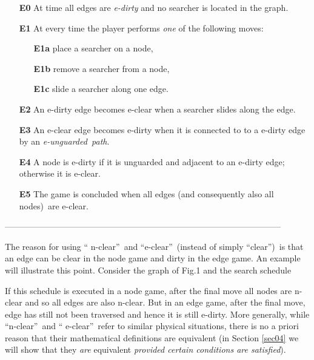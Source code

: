 \documentclass[11pt]{article}\usepackage{amsmath}
\begin{document}
\begin{enumerate}
\item[\textbf{{E0}}] At time  all edges are \emph{e-dirty} and no
searcher is located in the graph.

\item[\textbf{E1}] At every time  the player performs \emph{one} of
the following moves:

\begin{enumerate}
\item[\textbf{{E1a}}] place a searcher on a node,

\item[\textbf{{E1b}}] remove a searcher from a node,

\item[\textbf{{E1c}}] slide a searcher along one edge.
\end{enumerate}

\item[\textbf{{E2}}] An e-dirty edge becomes e-clear when a searcher slides
along the edge.

\item[\textbf{{E3}}] An e-clear edge  becomes e-dirty when it is connected
to to a e-dirty edge  by an \emph{e-unguarded\ path}.

\item[\textbf{{E4}}] A node is e-dirty if it is unguarded and adjacent to an
e-dirty edge; otherwise it is e-clear.

\item[\textbf{{E5}}] The game is concluded when all edges (and consequently
also all nodes)\ are e-clear.
\end{enumerate}

\begin{center}
--------------------------------------------------------------------------------------------------
\end{center}

\begin{remark}
\label{prp0201}The reason for using \textquotedblleft
n-clear\textquotedblright\ and \textquotedblleft e-clear\textquotedblright \ (instead of simply \textquotedblleft clear\textquotedblright)\ is that an
edge can be clear in the node game and dirty in the edge game. An example will
illustrate this point. Consider the graph of Fig.1 and the search schedule
   
 If this schedule is executed in a node game, after the final
move all nodes are n-clear and so all edges are also n-clear. But in an edge
game, after the final move, edge  has still not been
traversed and hence it is still e-dirty. More generally, while
\textquotedblleft n-clear\textquotedblright\ and \textquotedblleft
e-clear\textquotedblright\ refer to similar physical situations, there is no a
priori reason that their mathematical definitions are equivalent (in Section
\ref{sec04} we will show that they \emph{are }equivalent \emph{provided
certain conditions are satisfied}).
\end{remark}
\end{document}
